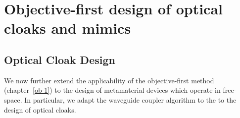 \renewcommand{\myfig}[2]{
    \begin{figure}[!h]\begin{center}
    \texttt{[image: meta/fig/\#1]}\caption{#2}\label{fig:#1}
    \end{center}\end{figure}}




\newcommand{\ER}[1]{\eqref{eq:#1}}
\newcommand{\SR}[1]{Section~\ref{sec:#1}}
\newcommand{\sR}[1]{section~\ref{sec:#1}}
\newcommand{\FR}[1]{Figure~\ref{fig:#1}}
\newcommand{\fR}[1]{figure~\ref{fig:#1}}

\chapter[Design of optical cloaks and mimics]{Objective-first design of optical cloaks and mimics}\label{ob-1 meta}
\section{Optical Cloak Design}
We now further extend the applicability of the objective-first method
    (chapter~\ref{ob-1})
    to the design of metamaterial devices which operate in free-space.
In particular,
    we adapt the waveguide coupler algorithm to the 
    to the design of optical cloaks.




